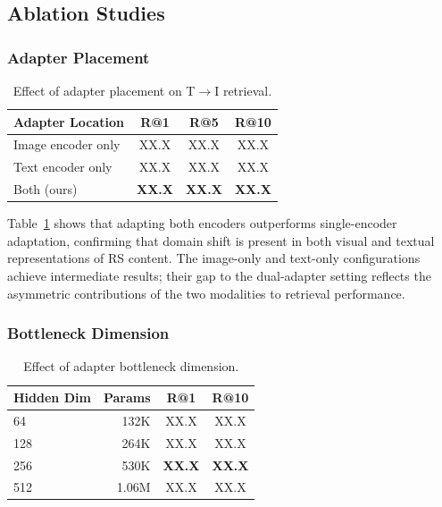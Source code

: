 \documentclass[review,12pt]{elsarticle}
\begin{document}
\subsection{Ablation Studies}
\subsubsection{Adapter Placement}
\begin{table}[h]
\centering
\caption{Effect of adapter placement on T$\rightarrow$I retrieval.}
\label{tab:ablation_placement}
\begin{tabular}{lccc}
\toprule
\textbf{Adapter Location} & R@1 & R@5 & R@10 \\
\midrule
Image encoder only  & XX.X & XX.X & XX.X \\
Text encoder only   & XX.X & XX.X & XX.X \\
Both (ours)         & \textbf{XX.X} & \textbf{XX.X} & \textbf{XX.X} \\
\bottomrule
\end{tabular}
\end{table}

Table~\ref{tab:ablation_placement} shows that adapting both encoders
outperforms single-encoder adaptation, confirming that domain shift is
present in both visual and textual representations of RS content. The
image-only and text-only configurations achieve intermediate results;
their gap to the dual-adapter setting reflects the asymmetric
contributions of the two modalities to retrieval performance.

\subsubsection{Bottleneck Dimension}
\begin{table}[h]
\centering
\caption{Effect of adapter bottleneck dimension.}
\label{tab:ablation_dim}
\begin{tabular}{lrcc}
\toprule
\textbf{Hidden Dim} & \textbf{Params} & R@1 & R@10 \\
\midrule
64  & 132K  & XX.X & XX.X \\
128 & 264K  & XX.X & XX.X \\
256 & 530K  & \textbf{XX.X} & \textbf{XX.X} \\
512 & 1.06M & XX.X & XX.X \\
\bottomrule
\end{tabular}
\end{table}
\end{document}
